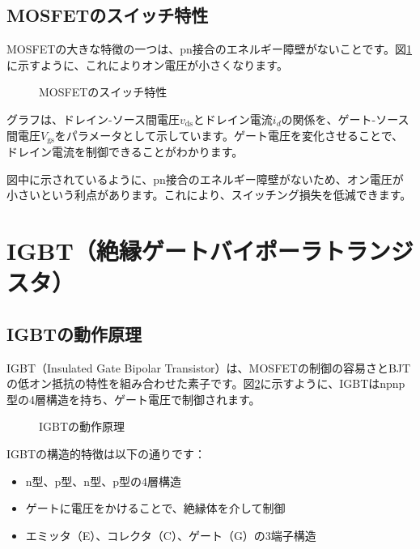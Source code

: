 \subsection{MOSFETのスイッチ特性}

MOSFETの大きな特徴の一つは、pn接合のエネルギー障壁がないことです。図\ref{fig:mosfet_characteristics}に示すように、これによりオン電圧が小さくなります。

\begin{figure}[H]
\centering
{}
\caption{MOSFETのスイッチ特性}
\label{fig:mosfet_characteristics}
\end{figure}

グラフは、ドレイン-ソース間電圧$v_{\text{ds}}$とドレイン電流$i_d$の関係を、ゲート-ソース間電圧$V_{\text{gs}}$をパラメータとして示しています。ゲート電圧を変化させることで、ドレイン電流を制御できることがわかります。

図中に示されているように、pn接合のエネルギー障壁がないため、オン電圧が小さいという利点があります。これにより、スイッチング損失を低減できます。

\section{IGBT（絶縁ゲートバイポーラトランジスタ）}

\subsection{IGBTの動作原理}

IGBT（Insulated Gate Bipolar Transistor）は、MOSFETの制御の容易さとBJTの低オン抵抗の特性を組み合わせた素子です。図\ref{fig:igbt}に示すように、IGBTはnpnp型の4層構造を持ち、ゲート電圧で制御されます。

\begin{figure}[H]
\centering
{}
\caption{IGBTの動作原理}
\label{fig:igbt}
\end{figure}

IGBTの構造的特徴は以下の通りです：

\begin{itemize}
\item n型、p型、n型、p型の4層構造
\item ゲートに電圧をかけることで、絶縁体を介して制御
\item エミッタ（E）、コレクタ（C）、ゲート（G）の3端子構造
\end{itemize}

